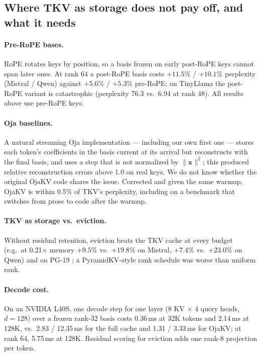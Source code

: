 \documentclass{article}
\begin{document}
\subsection{Where TKV as storage does not pay off, and what it needs}
\label{sec:prereq}

\paragraph{Pre-RoPE bases.} RoPE rotates keys by position, so a basis frozen
on early post-RoPE keys cannot span later ones. At rank 64 a post-RoPE basis
costs $+11.5\%$ / $+10.1\%$ perplexity (Mistral / Qwen) against $+5.6\%$ /
$+5.3\%$ pre-RoPE; on TinyLlama the post-RoPE variant is catastrophic
(perplexity 76.3 vs.\ 6.94 at rank 48). All results above use pre-RoPE keys.

\paragraph{Oja baselines.} A natural streaming Oja implementation --- including
our own first one --- stores each token's coefficients in the basis current at
its arrival but reconstructs with the final basis, and uses a step that is not
normalized by $\lVert\mathbf{x}\rVert^2$; this produced relative reconstruction
errors above 1.0 on real keys. We do not know whether the original OjaKV code
\citep{ojakov2025} shares the issue. Corrected and given the same warmup,
OjaKV is within 0.5\% of TKV's perplexity, including on a benchmark that
switches from prose to code after the warmup.

\paragraph{TKV as storage vs.\ eviction.} Without residual retention, eviction
beats the TKV cache at every budget (e.g.\ at 0.21$\times$ memory
$+9.5\%$ vs.\ $+19.8\%$ on Mistral, $+7.4\%$ vs.\ $+23.0\%$ on Qwen) and on
PG-19 \citep{rae2020}; a PyramidKV-style \citep{pyramidkv2024} rank schedule
was worse than uniform rank.

\paragraph{Decode cost.} On an NVIDIA L40S, one decode step for one layer
(8 KV $\times$ 4 query heads, $d{=}128$) over a frozen rank-32 basis costs
0.36\,ms at 32K tokens and 2.14\,ms at 128K, vs.\ 2.83 / 12.35\,ms for the full
cache and 1.31 / 3.33\,ms for OjaKV; at rank 64, 5.75\,ms at 128K. Residual
scoring for eviction adds one rank-8 projection per token.
\end{document}
